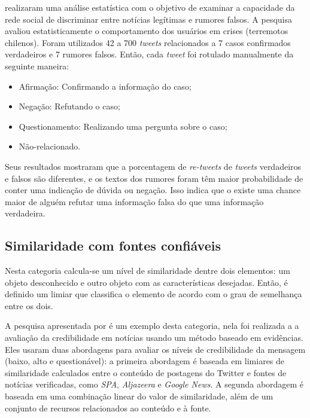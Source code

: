 \cite{mendoza_twitter_2010} realizaram uma análise estatística com o objetivo de examinar a capacidade da rede social de discriminar entre notícias legítimas e rumores falsos. A pesquisa avaliou estatisticamente o comportamento dos usuários em crises (terremotos chilenos). Foram utilizados 42 a 700 \emph{tweets} relacionados a 7 casos confirmados verdadeiros e 7 rumores falsos. Então, cada \emph{tweet} foi rotulado manualmente da seguinte maneira: 

\begin{itemize}
    \item Afirmação: Confirmando a informação do caso; 
    \item Negação: Refutando o caso;
    \item Questionamento: Realizando uma pergunta sobre o caso; 
    \item Não-relacionado.
\end{itemize}

Seus resultados mostraram que a porcentagem de \emph{re-tweets} de \emph{tweets} verdadeiros e falsos são diferentes, e os textos dos rumores foram têm maior probabilidade de conter uma indicação de dúvida ou negação. Isso indica que o existe uma chance maior de alguém refutar uma informação falsa do que uma informação verdadeira.

\subsection{Similaridade com fontes confiáveis}

Nesta categoria calcula-se um nível de similaridade dentre dois elementos: um objeto desconhecido e outro objeto com as características desejadas. Então, é definido um limiar que classifica o elemento de acordo com o grau de semelhança entre os dois.

A pesquisa apresentada por \cite{alkhalifa_experimental_2011} é um exemplo desta categoria, nela foi realizada a a avaliação da credibilidade em notícias usando um método baseado em evidências. Eles usaram duas abordagens para avaliar os níveis de credibilidade da mensagem (baixo, alto e questionável): a primeira abordagem é baseada em limiares de similaridade calculados entre o conteúdo de postagens do Twitter e fontes de notícias verificadas, como \emph{SPA}, \emph{Aljazeera} e \emph{Google News}. A segunda abordagem é baseada em uma combinação linear do valor de similaridade, além de um conjunto de recursos relacionados ao conteúdo e à fonte. 

